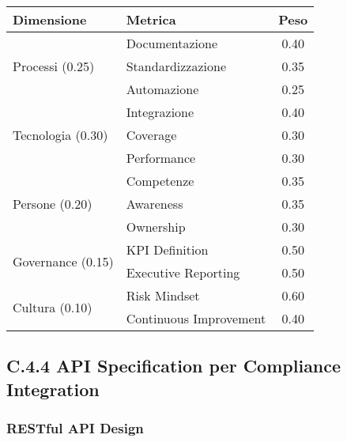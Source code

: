 \begin{table}[htbp]
\centering
\begin{tabular}{llc}
\toprule
\textbf{Dimensione} & \textbf{Metrica} & \textbf{Peso} \\
\midrule
\multirow{3}{*}{Processi (0.25)} & Documentazione & 0.40 \\
 & Standardizzazione & 0.35 \\
 & Automazione & 0.25 \\
\midrule
\multirow{3}{*}{Tecnologia (0.30)} & Integrazione & 0.40 \\
 & Coverage & 0.30 \\
 & Performance & 0.30 \\
\midrule
\multirow{3}{*}{Persone (0.20)} & Competenze & 0.35 \\
 & Awareness & 0.35 \\
 & Ownership & 0.30 \\
\midrule
\multirow{2}{*}{Governance (0.15)} & KPI Definition & 0.50 \\
 & Executive Reporting & 0.50 \\
\midrule
\multirow{2}{*}{Cultura (0.10)} & Risk Mindset & 0.60 \\
 & Continuous Improvement & 0.40 \\
\bottomrule
\end{tabular}
\end{table}

\subsection{\texorpdfstring{\textbf{C.4.4 API Specification per Compliance Integration}}{C.4.4 - API Specification per Compliance Integration}}

\subsubsection{RESTful API Design}

